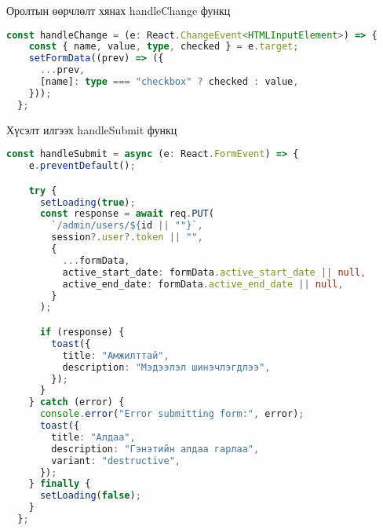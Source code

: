 Оролтын өөрчлөлт хянах handleChange функц
\begin{lstlisting}[language=Typescript, caption=handleChange, frame=single]
	const handleChange = (e: React.ChangeEvent<HTMLInputElement>) => {
    const { name, value, type, checked } = e.target;
    setFormData((prev) => ({
      ...prev,
      [name]: type === "checkbox" ? checked : value,
    }));
  };
\end{lstlisting}

Хүсэлт илгээх handleSubmit функц
\begin{lstlisting}[language=Typescript, caption=handleSubmit, frame=single]
	const handleSubmit = async (e: React.FormEvent) => {
    e.preventDefault();

    try {
      setLoading(true);
      const response = await req.PUT(
        `/admin/users/${id || ""}`,
        session?.user?.token || "",
        {
          ...formData,
          active_start_date: formData.active_start_date || null,
          active_end_date: formData.active_end_date || null,
        }
      );

      if (response) {
        toast({
          title: "Амжилттай",
          description: "Мэдээлэл шинэчлэгдлээ",
        });
      }
    } catch (error) {
      console.error("Error submitting form:", error);
      toast({
        title: "Алдаа",
        description: "Гэнэтийн алдаа гарлаа",
        variant: "destructive",
      });
    } finally {
      setLoading(false);
    }
  };
\end{lstlisting}

